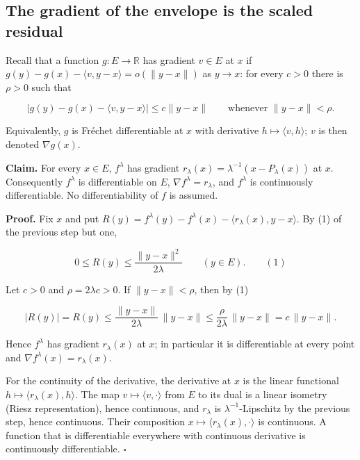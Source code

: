 \documentclass[11pt,a4paper]{report}
\begin{document}
\subsection{\texorpdfstring{The gradient of the envelope is the scaled residual}{The gradient of the envelope is the scaled residual}}
\label{report-step-ProximalLangevin-Moreau-lean-4}


Recall that a function \(g:E\to\mathbb R\) has gradient \(v\in E\) at \(x\) if \(g(y)-g(x)-\langle v,y-x\rangle=o(\|y-x\|)\) as \(y\to x\): for every \(c>0\) there is \(\rho>0\) such that


\[|g(y)-g(x)-\langle v,y-x\rangle|\le c\|y-x\|\qquad\text{whenever }\|y-x\|<\rho.\]


Equivalently, \(g\) is Fréchet differentiable at \(x\) with derivative \(h\mapsto\langle v,h\rangle\); \(v\) is then denoted \(\nabla g(x)\).




\textbf{Claim.} For every \(x\in E\), \(f^\lambda\) has gradient \(r_\lambda(x)=\lambda^{-1}(x-P_\lambda(x))\) at \(x\). Consequently \(f^\lambda\) is differentiable on \(E\), \(\nabla f^\lambda=r_\lambda\), and \(f^\lambda\) is continuously differentiable. No differentiability of \(f\) is assumed.




\textbf{Proof.} Fix \(x\) and put \(R(y)=f^\lambda(y)-f^\lambda(x)-\langle r_\lambda(x),y-x\rangle\). By (1) of the previous step but one,


\[0\le R(y)\le\frac{\|y-x\|^2}{2\lambda}\qquad(y\in E).\qquad(1)\]


Let \(c>0\) and \(\rho=2\lambda c>0\). If \(\|y-x\|<\rho\), then by (1)


\[|R(y)|=R(y)\le\frac{\|y-x\|}{2\lambda}\,\|y-x\|\le\frac{\rho}{2\lambda}\,\|y-x\|=c\,\|y-x\|.\]


Hence \(f^\lambda\) has gradient \(r_\lambda(x)\) at \(x\); in particular it is differentiable at every point and \(\nabla f^\lambda(x)=r_\lambda(x)\).




For the continuity of the derivative, the derivative at \(x\) is the linear functional \(h\mapsto\langle r_\lambda(x),h\rangle\). The map \(v\mapsto\langle v,\cdot\rangle\) from \(E\) to its dual is a linear isometry (Riesz representation), hence continuous, and \(r_\lambda\) is \(\lambda^{-1}\)-Lipschitz by the previous step, hence continuous. Their composition \(x\mapsto\langle r_\lambda(x),\cdot\rangle\) is continuous. A function that is differentiable everywhere with continuous derivative is continuously differentiable. \(\square\)
\end{document}
